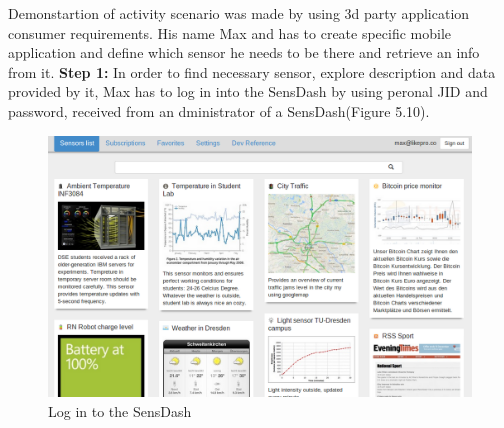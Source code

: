 Demonstartion of activity scenario was made by using 3d party application consumer requirements. His name Max and has to create specific mobile application and define which sensor he needs to be there and retrieve an info from it. 
\newline
\textbf{Step 1:} In order to find necessary sensor, explore description and data provided by it, Max has to log in into the SensDash by using peronal JID and password, received from an dministrator of a SensDash(Figure 5.10).

\begin{figure}[!ht]
\centering
\includegraphics[scale=0.6]{Screenshots/UseCaseScreenshot1.png}   
\caption[Log in to the SensDash]{Log in to the SensDash}                         
\end{figure}

